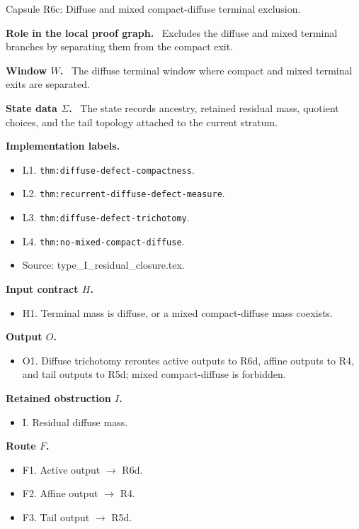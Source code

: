 \documentclass[11pt]{amsart}
\newcommand{\capsulefield}[1]{\par\smallskip\noindent\textbf{#1.}\ }
\begin{document}
\begin{proofcapsule}{Capsule R6c: Diffuse and mixed compact-diffuse terminal exclusion.}
  \capsulefield{Role in the local proof graph}
  Excludes the diffuse and mixed terminal branches by separating them from the compact exit.

  \capsulefield{Window \(W\)}
The diffuse terminal window where compact and mixed terminal exits are separated.

  \capsulefield{State data \(\Sigma\)}
The state records ancestry, retained residual mass, quotient choices, and the tail topology attached to the current stratum.

  \capsulefield{Implementation labels}
  \begin{itemize}[leftmargin=1.8em]
  \item L1. \texttt{thm:diffuse-defect-compactness}.
  \item L2. \texttt{thm:recurrent-diffuse-defect-measure}.
  \item L3. \texttt{thm:diffuse-defect-trichotomy}.
  \item L4. \texttt{thm:no-mixed-compact-diffuse}.
  \item Source: type\_I\_residual\_closure.tex.
  \end{itemize}

  \capsulefield{Input contract \(H\)}
  \begin{itemize}[leftmargin=1.8em]
  \item H1. Terminal mass is diffuse, or a mixed compact-diffuse mass coexists.
  \end{itemize}

  \capsulefield{Output \(O\)}
  \begin{itemize}[leftmargin=1.8em]
  \item O1. Diffuse trichotomy reroutes active outputs to R6d, affine outputs to R4, and tail outputs to R5d; mixed compact-diffuse is forbidden.
  \end{itemize}

  \capsulefield{Retained obstruction \(I\)}
  \begin{itemize}[leftmargin=1.8em]
  \item I. Residual diffuse mass.
  \end{itemize}

  \capsulefield{Route \(F\)}
  \begin{itemize}[leftmargin=1.8em]
  \item F1. Active output $\to$ R6d.
  \item F2. Affine output $\to$ R4.
  \item F3. Tail output $\to$ R5d.
  \end{itemize}


\end{proofcapsule}
\end{document}
